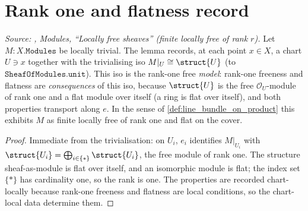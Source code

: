 \section{Rank one and flatness record}
\label{sec:lbc_rank_flat}


\begin{lemma}\leanok
  \label{lem:lbc_rank_flat}
  \textit{Source: \cite{stacks-project}, Modules, ``Locally free sheaves'' (finite
  locally free of rank \(r\)).}
  Let \(M : X.\mathtt{Modules}\) be locally trivial. The lemma records, at each
  point \(x \in X\), a chart \(U \ni x\) together with the trivialising iso
  \(M|_U \cong \struct{U}\) (to \(\mathtt{SheafOfModules.unit}\)). This iso is the
  rank-one free \emph{model}: rank-one freeness and flatness are
  \emph{consequences} of this iso, because \(\struct{U}\) is the free
  \(\mathcal{O}_U\)-module of rank one and a flat module over itself (a ring is
  flat over itself), and both properties transport along \(e\). In the sense of
  \cref{def:line_bundle_on_product} this exhibits \(M\) as finite locally free
  of rank one and flat on the cover.
\end{lemma}

\begin{proof}
  \leanok
  Immediate from the trivialisation: on \(U_i\), \(e_i\) identifies \(M|_{U_i}\)
  with \(\struct{U_i} = \bigoplus_{i \in \{*\}} \struct{U_i}\), the free module
  of rank one. The structure sheaf-as-module is flat over itself, and an
  isomorphic module is flat; the index set \(\{*\}\) has cardinality one, so the
  rank is one. The properties are recorded chart-locally because rank-one
  freeness and flatness are local conditions, so the chart-local data determine
  them.
\end{proof}

